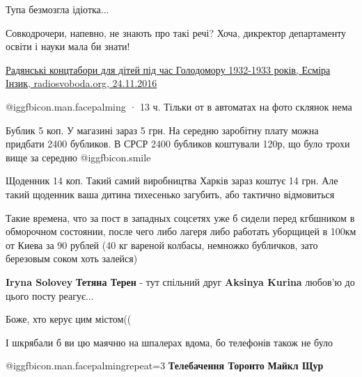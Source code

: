 \begin{itemize}
Тупа безмозгла ідіотка...


Совкодрочери, напевно, не знають про такі речі? Хоча, дикректор департаменту
освіти і науки мала би знати! 

\href{https://www.radiosvoboda.org/a/28137445.html}{%
Радянські концтабори для дітей під час Голодомору 1932-1933 років, Есміра Інзик, radiosvoboda.org, 24.11.2016%
}

 @igg{fbicon.man.facepalming} 
 · 13 ч.
Тільки от в автоматах на фото склянок нема


Бублик 5 коп. У магазині зараз 5 грн. На середню заробітну плату можна придбати
2400 бубликов. В СРСР 2400 бубликов коштували 120р, що було трохи вище за
середню  @igg{fbicon.smile} 

Щоденник 14 коп. Такий самий виробництва Харків зараз коштує 14 грн. Але такий
щоденник ваша дитина тихесенько загубить, або тактично відмовиться


Такие времена, что за пост в западных соцсетях уже б сидели перед кгбшником в
обморочном состоянии, после чего либо лагеря либо работать уборщицей в 100км от
Киева за 90 рублей (40 кг вареной колбасы, немножко бубличков, зато березовым
соком хоть залейся)


\textbf{Iryna Solovey} \textbf{Тетяна Терен} - тут спільний друг \textbf{Aksinya Kurina} любов'ю до цього посту реагує...


Боже, хто керує цим містом((

І шкрябали б ви цю маячню на шпалерах вдома, бо телефонів також не було

 @igg{fbicon.man.facepalming}{repeat=3} 
\textbf{Телебачення Торонто}
\textbf{Майкл Щур}


\end{itemize} %
